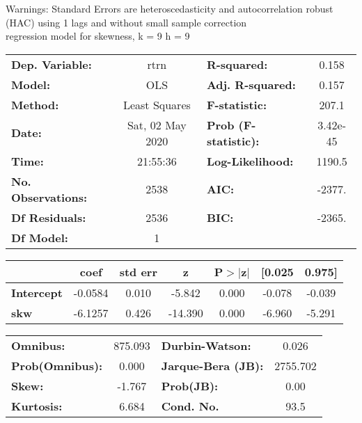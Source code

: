 Warnings: \newline
 [1] Standard Errors are heteroscedasticity and autocorrelation robust (HAC) using 1 lags and without small sample correction\\ 

regression model for skewness, k = 9 h = 9\begin{center}
\begin{tabular}{lclc}
\toprule
\textbf{Dep. Variable:}    &       rtrn       & \textbf{  R-squared:         } &     0.158   \\
\textbf{Model:}            &       OLS        & \textbf{  Adj. R-squared:    } &     0.157   \\
\textbf{Method:}           &  Least Squares   & \textbf{  F-statistic:       } &     207.1   \\
\textbf{Date:}             & Sat, 02 May 2020 & \textbf{  Prob (F-statistic):} &  3.42e-45   \\
\textbf{Time:}             &     21:55:36     & \textbf{  Log-Likelihood:    } &    1190.5   \\
\textbf{No. Observations:} &        2538      & \textbf{  AIC:               } &    -2377.   \\
\textbf{Df Residuals:}     &        2536      & \textbf{  BIC:               } &    -2365.   \\
\textbf{Df Model:}         &           1      & \textbf{                     } &             \\
\bottomrule
\end{tabular}
\begin{tabular}{lcccccc}
                   & \textbf{coef} & \textbf{std err} & \textbf{z} & \textbf{P$> |$z$|$} & \textbf{[0.025} & \textbf{0.975]}  \\
\midrule
\textbf{Intercept} &      -0.0584  &        0.010     &    -5.842  &         0.000        &       -0.078    &       -0.039     \\
\textbf{skw}       &      -6.1257  &        0.426     &   -14.390  &         0.000        &       -6.960    &       -5.291     \\
\bottomrule
\end{tabular}
\begin{tabular}{lclc}
\textbf{Omnibus:}       & 875.093 & \textbf{  Durbin-Watson:     } &    0.026  \\
\textbf{Prob(Omnibus):} &   0.000 & \textbf{  Jarque-Bera (JB):  } & 2755.702  \\
\textbf{Skew:}          &  -1.767 & \textbf{  Prob(JB):          } &     0.00  \\
\textbf{Kurtosis:}      &   6.684 & \textbf{  Cond. No.          } &     93.5  \\
\bottomrule
\end{tabular}
\end{center}

